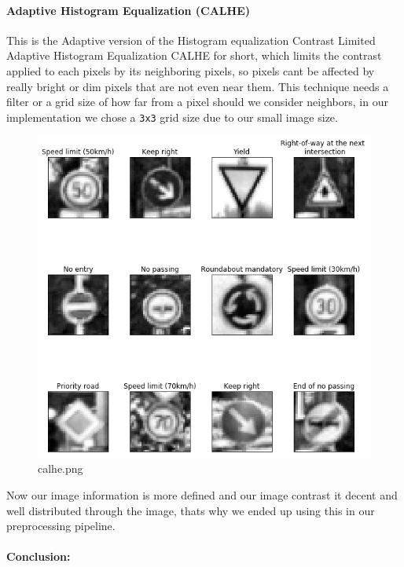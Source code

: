 \documentclass[11pt]{article}
\makeatletter
\def\maxwidth{\ifdim\Gin@nat@width>\linewidth\linewidth
    \else\Gin@nat@width\fi}
\let\Oldincludegraphics\includegraphics
\renewcommand{\includegraphics}[1]{\Oldincludegraphics[width=.8\maxwidth]{#1}}
\makeatother
\begin{document}
\hypertarget{adaptive-histogram-equalization-calhe}{%
\paragraph{Adaptive Histogram Equalization
(CALHE)}\label{adaptive-histogram-equalization-calhe}}

This is the Adaptive version of the Histogram equalization Contrast
Limited Adaptive Histogram Equalization CALHE for short, which limits
the contrast applied to each pixels by its neighboring pixels, so pixels
cant be affected by really bright or dim pixels that are not even near
them. This technique needs a filter or a grid size of how far from a
pixel should we consider neighbors, in our implementation we chose a
\texttt{3x3} grid size due to our small image size.

\begin{figure}
\centering
\includegraphics{./assets/calhe.png}
\caption{calhe.png}
\end{figure}

Now our image information is more defined and our image contrast it
decent and well distributed through the image, thats why we ended up
using this in our preprocessing pipeline.

\hypertarget{conclusion}{%
\paragraph{Conclusion:}\label{conclusion}}
\end{document}
